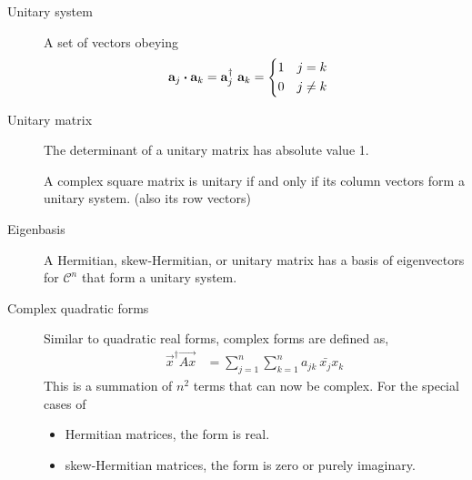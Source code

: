 \begin{description}
    \item[Unitary system] A set of vectors obeying
        \begin{align}
            \mathbf{a}_j \boldsymbol{\cdot} \mathbf{a}_k = \mathbf{a}_{j}^\dag\ \mathbf{a}_k &
            = \begin{dcases}
                  1 & j = k    \\
                  0 & j \neq k
              \end{dcases}
        \end{align}

    \item[Unitary matrix] The determinant of a unitary matrix has absolute value 1.
        \par A complex square matrix is unitary if and only if its column vectors form a
        unitary system. (also its row vectors)

    \item[Eigenbasis] A Hermitian, skew-Hermitian, or unitary matrix has a basis of
        eigenvectors for $ \mathcal{C}^n $ that form a unitary system.

    \item[Complex quadratic forms] Similar to quadratic real forms, complex forms are
        defined as,
        \begin{align}
            \vec{x}^\dag \vec{Ax} & = \sum_{j=1}^{n} \sum_{k=1}^{n}
            a_{jk}\ \bar{x_j} x_k
        \end{align}
        This is a summation of $ n^2 $ terms that can now be complex.
        For the special cases of
        \begin{itemize}
            \item Hermitian matrices, the form is real.
            \item skew-Hermitian matrices, the form is zero or purely imaginary.
        \end{itemize}
\end{description}